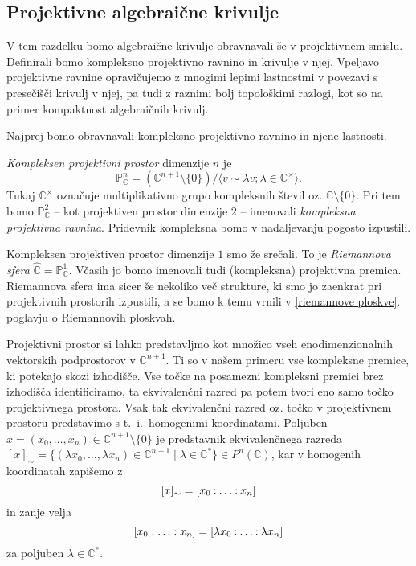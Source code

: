 \documentclass[mat1]{fmfdelo}
\numberwithin{equation}{section}
\newcommand{\C}{\mathbb C}
\newcommand{\CM}{\mathbb C ^*}
\newcommand{\PC}{\mathbb{P}^2_\C}
\newcommand{\pcoor}[1]{%
\begingroup\lccode`~=`: \lowercase{\endgroup
\edef~}{\mathbin{\mathchar\the\mathcode`:}\nobreak}%
\left[%
\begingroup
\mathcode`:=\string"8000
#1%
\endgroup
\right]%
}
\newcommand{\ti}{t.~i.\ }
\theoremstyle{definition}
\begin{document}
 

\subsection{Projektivne algebraične krivulje}

V tem razdelku bomo algebraične krivulje obravnavali še v projektivnem smislu. Definirali bomo kompleksno projektivno ravnino in krivulje v njej. Vpeljavo projektivne ravnine opravičujemo z mnogimi lepimi lastnostmi v povezavi s presečišči krivulj v njej, pa tudi z raznimi bolj topološkimi razlogi, kot so na primer kompaktnost algebraičnih krivulj.

Najprej bomo obravnavali kompleksno projektivno ravnino in njene lastnosti. 
\begin{definicija}
    \emph{Kompleksen projektivni prostor} dimenzije $n$ je 
    \[
        \mathbb{P}^n_\C = (\C^{n+1} \setminus \{0 \}) / \langle v \sim \lambda v; \lambda \in \C^{\times} \rangle.
    \]
    Tukaj $\C^{\times}$ označuje multiplikativno grupo kompleksnih števil oz. $\C \setminus \{0 \}$. 
    Pri tem bomo $\PC$ -- kot projektiven prostor dimenzije $2$ -- imenovali \emph{kompleksna projektivna ravnina}. Pridevnik kompleksna bomo v nadaljevanju pogosto izpustili.
\end{definicija}

\begin{primer*}
    Kompleksen projektiven prostor dimenzije $1$ smo že srečali. To je \emph{Riemannova sfera} $\widehat{\C} = \mathbb{P}^1_\C$. Včasih jo bomo imenovali tudi (kompleksna) projektivna premica. Riemannova sfera ima sicer še nekoliko več strukture, ki smo jo zaenkrat pri projektivnih prostorih izpustili, a se bomo k temu vrnili v \ref{riemannove ploskve}. poglavju o Riemannovih ploskvah.
\end{primer*}

Projektivni prostor si lahko predstavljmo kot množico vseh enodimenzionalnih vektorskih podprostorov v $\C^{n+1}$. Ti so v našem primeru vse kompleksne premice, ki potekajo skozi izhodišče. Vse točke na posamezni kompleksni premici brez izhodišča identificiramo, ta ekvivalenčni razred pa potem tvori eno samo točko projektivnega prostora. Vsak tak ekvivalenčni razred oz. točko v projektivnem prostoru predstavimo s \ti homogenimi koordinatami. Poljuben $x = (x_0, \dots, x_n) \in \C^{n+1}\setminus \{0\}$ je predstavnik ekvivalenčnega razreda $[x]_\sim = \{(\lambda x_0, \dots, \lambda x_n) \in \C^{n+1} \mid \lambda \in \CM\} \in P^n(\C)$, kar v homogenih koordinatah zapišemo z
    \[
        [x]_\sim = \pcoor{x_0 : \ldots : x_n}
    \]
in zanje velja
    \[
        [x_0: \ldots: x_n] = \pcoor{\lambda x_0: \ldots: \lambda x_n}
    \]
za poljuben $\lambda \in \CM$.
\end{document}
